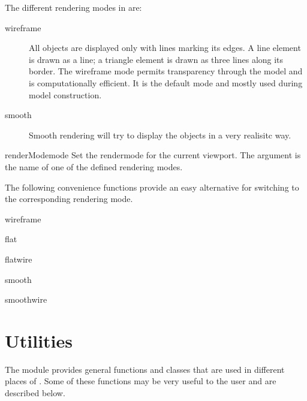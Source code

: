 The different rendering modes in \pyformex are:
\begin{description}
  \item[wireframe] All objects are displayed only with lines marking its edges. A line element is drawn as a line; a triangle element is drawn as three lines along its border. The wireframe mode permits transparency through the model and is computationally efficient. It is the default mode and mostly used during model construction.
  \item[smooth] Smooth rendering will try to display the objects in a very realisitc way. 
\end{description}


\begin{funcdesc}{renderMode}{mode}
Set the rendermode for the current viewport. The argument is the name of one of the defined rendering modes.
\end{funcdesc}

The following convenience functions provide an easy alternative for switching to the corresponding rendering mode.
    
\begin{funcdesc}{wireframe}{}
\end{funcdesc}
\begin{funcdesc}{flat}{}
\end{funcdesc}
\begin{funcdesc}{flatwire}{}
\end{funcdesc}
\begin{funcdesc}{smooth}{}
\end{funcdesc}
\begin{funcdesc}{smoothwire}{}
\end{funcdesc}



\section{Utilities}
\label{sec:utilities}

The  module provides general functions and classes that are used in different places of \pyformex. Some of these functions may be very useful to the user and are described below.

